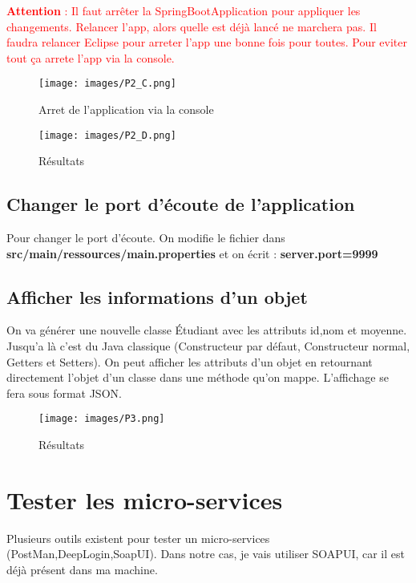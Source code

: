 \documentclass{rapport}
\begin{document}
\textcolor{red}{\textbf{Attention} : Il faut arrêter la SpringBootApplication pour appliquer les changements. Relancer l'app, alors quelle est déjà lancé ne marchera pas. Il faudra relancer Eclipse pour arreter l'app une bonne fois pour toutes. Pour eviter tout ça arrete l'app via la console.}

\begin{figure}[H]
	\centering
    \texttt{[image: images/P2\_C.png]}
    \caption{Arret de l'application via la console}
\end{figure}

\begin{figure}[H]
	\centering
    \texttt{[image: images/P2\_D.png]}
    \caption{Résultats}
\end{figure}
\subsection{Changer le port d'écoute de l'application}

Pour changer le port d'écoute. On modifie le fichier dans \textbf{src/main/ressources/main.properties} et on écrit : \textbf{server.port=9999}


\subsection{Afficher les informations d'un objet}

On va générer une nouvelle classe Étudiant avec les attributs id,nom et moyenne. Jusqu'a là c'est du Java classique (Constructeur par défaut, Constructeur normal, Getters et Setters).
On peut afficher les attributs d'un objet en retournant directement l'objet d'un classe dans une méthode qu'on mappe. L'affichage se fera sous format JSON.

\begin{figure}[H]
	\centering
    \texttt{[image: images/P3.png]}
    \caption{Résultats}
\end{figure}

\section{Tester les micro-services}

Plusieurs outils existent pour tester un micro-services (PostMan,DeepLogin,SoapUI). Dans notre cas, je vais utiliser SOAPUI, car il est déjà présent dans ma machine.\newline
\end{document}
